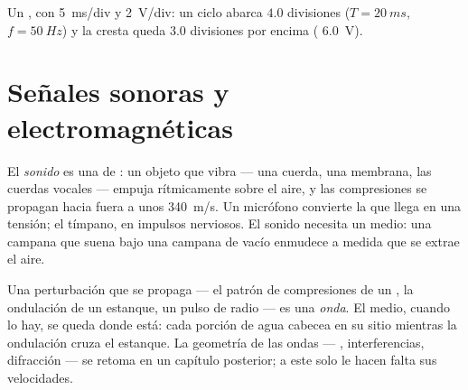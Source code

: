 \begin{omfigure}

{\small Un , con  \qty{5}{ms}/div y 
\qty{2}{V}/div: un ciclo abarca $4.0$ divisiones
($T = \qty{20}{ms}$, $f = \qty{50}{Hz}$) y la cresta queda $3.0$
divisiones por encima ( \qty{6.0}{V}).}
\end{omfigure}

\section{Señales sonoras y electromagnéticas}

\begin{definition}[Sonido]\label{def:g10:signals-and-waves:sound}
El \emph{sonido} es una  de : un objeto que
vibra --- una cuerda, una membrana, las cuerdas vocales --- empuja
rítmicamente sobre el aire, y las compresiones se propagan hacia fuera a
unos \qty{340}{m/s}. Un micrófono convierte la  que llega en una
tensión; el tímpano, en impulsos nerviosos. El sonido necesita un medio:
una campana que suena bajo una campana de vacío enmudece a medida que se
extrae el aire.
\end{definition}

\begin{definition}[Onda]\label{def:g10:signals-and-waves:wave}
Una perturbación que se propaga --- el patrón de compresiones de un
, la ondulación de un estanque, un pulso de radio --- es una
\emph{onda}. El medio, cuando lo hay, se queda donde está:
cada porción de agua cabecea en su sitio mientras la ondulación cruza el
estanque. La geometría de las ondas --- ,
interferencias, difracción --- se retoma en un capítulo posterior; a
este solo le hacen falta sus velocidades.
\end{definition}

